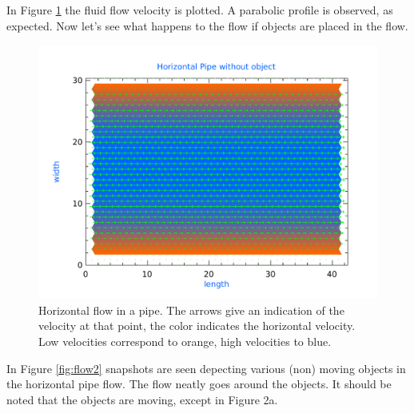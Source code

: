In Figure \ref{fig:flow1} the fluid flow velocity is plotted. A parabolic profile is observed, as expected. Now let's see what happens to the flow if objects are placed in the flow.

\begin{figure}[ht!]
\centering
\includegraphics[width=.7\textwidth]{plots/flow.pdf}
\caption{Horizontal flow in a pipe. The arrows give an indication of the velocity at that point, the color indicates the horizontal velocity. Low velocities correspond to orange, high velocities to blue. }
\label{fig:flow1}
\end{figure}



In Figure \ref{fig:flow2} snapshots are seen depecting various (non) moving objects in the horizontal pipe flow. The flow neatly goes around the objects. It should be noted that the objects are moving, except in Figure 2a.

